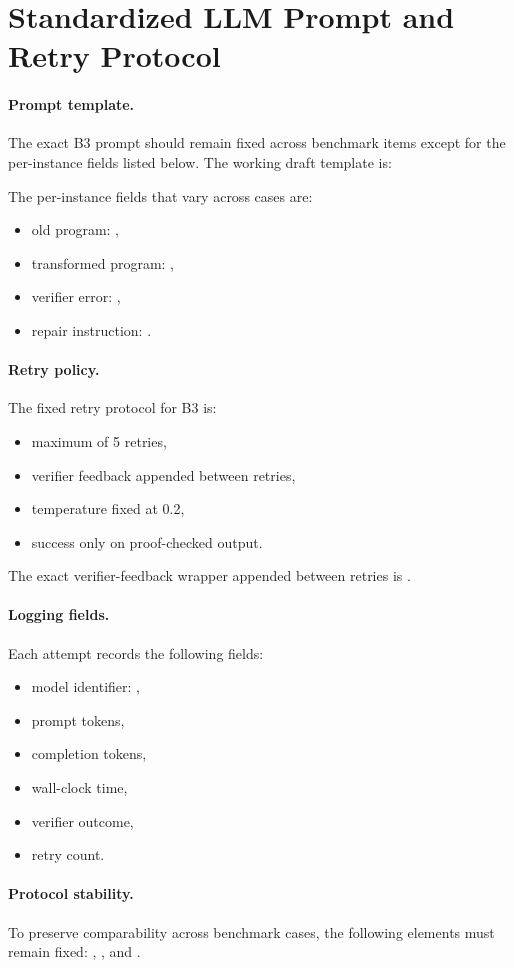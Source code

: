\section{Standardized LLM Prompt and Retry Protocol}
\label{app:prompt}

\paragraph{Prompt template.}
The exact B3 prompt should remain fixed across benchmark items except for the per-instance fields listed below. The working draft template is:
\begin{quote}
\end{quote}
The per-instance fields that vary across cases are:
\begin{itemize}
  \item old program: ,
  \item transformed program: ,
  \item verifier error: ,
  \item repair instruction: .
\end{itemize}

\paragraph{Retry policy.}
The fixed retry protocol for B3 is:
\begin{itemize}
  \item maximum of 5 retries,
  \item verifier feedback appended between retries,
  \item temperature fixed at 0.2,
  \item success only on proof-checked output.
\end{itemize}
The exact verifier-feedback wrapper appended between retries is .

\paragraph{Logging fields.}
Each attempt records the following fields:
\begin{itemize}
  \item model identifier: ,
  \item prompt tokens,
  \item completion tokens,
  \item wall-clock time,
  \item verifier outcome,
  \item retry count.
\end{itemize}

\paragraph{Protocol stability.}
To preserve comparability across benchmark cases, the following elements must remain fixed: , , and .
